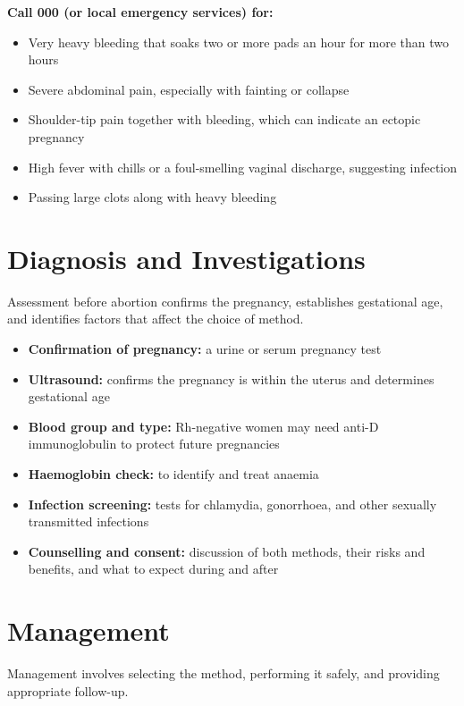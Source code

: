 \textbf{Call 000 (or local emergency services) for:}
\begin{itemize}
    \item Very heavy bleeding that soaks two or more pads an hour for more than two hours
    \item Severe abdominal pain, especially with fainting or collapse
    \item Shoulder-tip pain together with bleeding, which can indicate an ectopic pregnancy
    \item High fever with chills or a foul-smelling vaginal discharge, suggesting infection
    \item Passing large clots along with heavy bleeding
\end{itemize}

\section*{Diagnosis and Investigations}
Assessment before abortion confirms the pregnancy, establishes gestational age, and identifies factors that affect the choice of method.

\begin{itemize}
    \item \textbf{Confirmation of pregnancy:} a urine or serum pregnancy test
    \item \textbf{Ultrasound:} confirms the pregnancy is within the uterus and determines gestational age
    \item \textbf{Blood group and type:} Rh-negative women may need anti-D immunoglobulin to protect future pregnancies
    \item \textbf{Haemoglobin check:} to identify and treat anaemia
    \item \textbf{Infection screening:} tests for chlamydia, gonorrhoea, and other sexually transmitted infections
    \item \textbf{Counselling and consent:} discussion of both methods, their risks and benefits, and what to expect during and after
\end{itemize}

\section*{Management}
Management involves selecting the method, performing it safely, and providing appropriate follow-up.

